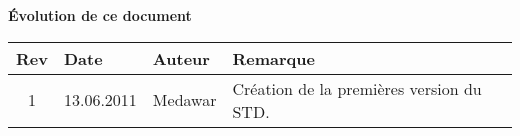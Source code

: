 \begin{large}
\textbf{Évolution de ce  document\\}
\end{large}
\begin{tabular}{|c|l|l|l|}
\hline  Rev &  Date &  Auteur & Remarque \\ 
\hline  1 &  13.06.2011 & Medawar  & Création de la premières version du STD. \\ 
\hline 
\end{tabular} 